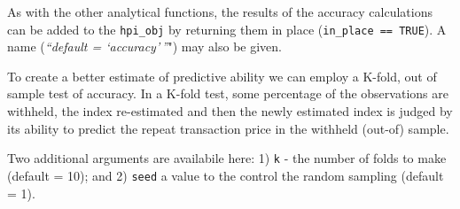 \documentclass[]{article}
\newenvironment{Shaded}{\begin{snugshade}}{\end{snugshade}}
\newcommand{\CommentTok}[1]{\textcolor[rgb]{0.56,0.35,0.01}{\textit{#1}}}
\newcommand{\DataTypeTok}[1]{\textcolor[rgb]{0.13,0.29,0.53}{#1}}
\newcommand{\KeywordTok}[1]{\textcolor[rgb]{0.13,0.29,0.53}{\textbf{#1}}}
\newcommand{\NormalTok}[1]{#1}
\newcommand{\OperatorTok}[1]{\textcolor[rgb]{0.81,0.36,0.00}{\textbf{#1}}}
\newcommand{\OtherTok}[1]{\textcolor[rgb]{0.56,0.35,0.01}{#1}}
\newcommand{\StringTok}[1]{\textcolor[rgb]{0.31,0.60,0.02}{#1}}
\begin{document}
As with the other analytical functions, the results of the accuracy
calculations can be added to the \texttt{hpi\_obj} by returning them in
place (\texttt{in\_place\ ==\ TRUE}). A name (\emph{``default =
`accuracy'\,''}") may also be given.

\begin{Shaded}
\end{Shaded}

To create a better estimate of predictive ability we can employ a
K-fold, out of sample test of accuracy. In a K-fold test, some
percentage of the observations are withheld, the index re-estimated and
then the newly estimated index is judged by its ability to predict the
repeat transaction price in the withheld (out-of) sample.

Two additional arguments are availabile here: 1) \texttt{k} - the number
of folds to make (default = 10); and 2) \texttt{seed} a value to the
control the random sampling (default = 1).
\end{document}
